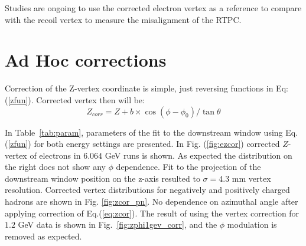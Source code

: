 \documentclass[12pt]{article}
\begin{document}
\noindent

Studies are ongoing to use the corrected electron vertex as a reference to compare with the recoil vertex to measure the misalignment of the RTPC.






\section{Ad Hoc corrections}


Correction of the Z-vertex coordinate is simple, just reversing functions in Eq:(\ref{zfun}).  Corrected vertex then will be:
\begin{equation}
Z_{corr}=Z+b\times\cos(\phi-\phi_0)/\tan\theta
\label{eq:zcor}
\end{equation}

In Table~\ref{tab:param}, parameters of the fit to the downstream window using Eq.(\ref{zfun}) for both energy settings are presented. In Fig. (\ref{fig:ezcor}) corrected $Z$-vertex of electrons in $6.064$ GeV runs is shown. As expected the distribution on the right does not show any $\phi$ dependence. Fit to the projection of the downstream window position on the z-axis resulted to $\sigma=4.3$ mm vertex resolution. Corrected vertex distributions for negatively and positively charged hadrons are shown in Fig. \ref{fig:zcor_pn}. No dependence on azimuthal angle after applying correction of Eq.(\ref{eq:zcor}).
The result of using the vertex correction for $1.2$ GeV data is shown in Fig.~\ref{fig:zphi1gev_corr}, and the $\phi$ modulation is removed as expected.
\end{document}
